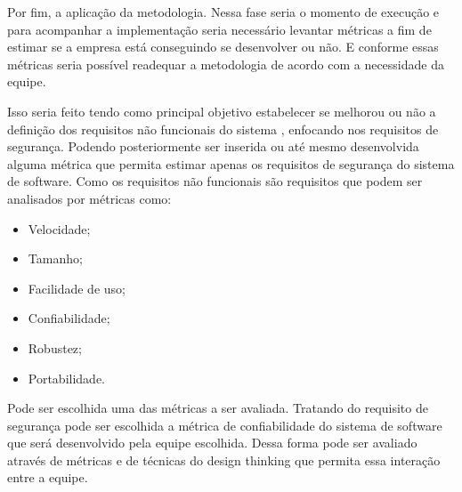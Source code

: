\documentclass[a4paper,twoside]{article}
\begin{document}
Por fim, a aplicação da metodologia. Nessa fase seria o momento de execução e para acompanhar a implementação seria necessário levantar métricas a fim de estimar se a empresa está conseguindo se desenvolver ou não. E conforme essas métricas seria possível readequar a metodologia de acordo com a necessidade da equipe. 

Isso seria feito tendo como principal objetivo estabelecer se melhorou ou não a definição dos requisitos não funcionais do sistema , enfocando nos requisitos de segurança.
Podendo posteriormente ser inserida ou até mesmo desenvolvida alguma métrica que permita estimar apenas os requisitos de segurança do sistema de software. Como os requisitos não funcionais são requisitos que podem ser analisados por métricas como\cite{Sommerville_2011_texbook}: 
\begin{itemize}
    \item Velocidade;
    \item Tamanho;
    \item Facilidade de uso;
    \item Confiabilidade;
    \item Robustez;
    \item Portabilidade.
\end{itemize}

Pode ser escolhida uma das métricas a ser avaliada. Tratando do requisito de segurança pode ser escolhida a métrica de confiabilidade do sistema de software que será desenvolvido pela equipe escolhida. Dessa forma pode ser avaliado através de métricas e de técnicas do design thinking que permita essa interação entre a equipe.


{\small 
}
\end{document}
